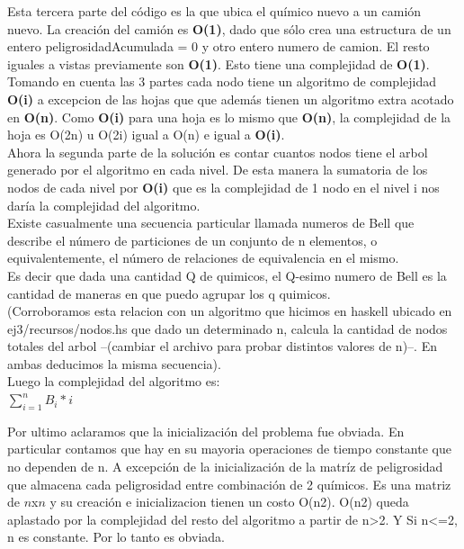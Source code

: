 \noindent 
Esta tercera parte del c\'odigo es la que ubica el qu\'imico nuevo a un cami\'on nuevo. La creaci\'on del cami\'on es \textbf{O(1)}, dado que s\'olo crea una estructura de un entero peligrosidadAcumulada = 0 y otro entero numero de camion. El resto iguales a vistas previamente son \textbf{O(1)}. Esto tiene una complejidad de \textbf{O(1)}. \\

\noindent 
Tomando en cuenta las 3 partes cada nodo tiene un algoritmo de complejidad \textbf{O(i)} a excepcion de las hojas que que adem\'as tienen un algoritmo extra acotado en \textbf{O(n)}. Como \textbf{O(i)} para una hoja es lo mismo que \textbf{O(n)}, la complejidad de la hoja es O(2n) u O(2i) igual a O(n) e igual a \textbf{O(i)}. \\

\noindent 
Ahora la segunda parte de la soluci\'on es contar cuantos nodos tiene el arbol generado por el algoritmo en cada nivel. De esta manera la sumatoria de los nodos de cada nivel por \textbf{O(i)} que es la complejidad de 1 nodo en el nivel i nos dar\'ia la complejidad del algoritmo.\\

\noindent 
Existe casualmente una secuencia particular llamada numeros de Bell que describe el número de particiones de un conjunto de n elementos, o equivalentemente, el número de relaciones de equivalencia en el mismo. \\
Es decir que dada una cantidad Q de quimicos, el Q-esimo numero de Bell es la cantidad de maneras en que puedo agrupar los q quimicos.\\
(Corroboramos esta relacion con un algoritmo que hicimos en haskell ubicado en ej3/recursos/nodos.hs que dado un determinado n, calcula la cantidad de nodos totales del arbol --(cambiar el archivo para probar distintos valores de n)--. En ambas deducimos la misma secuencia).\\

\noindent 
Luego la complejidad del algoritmo es: \\
$\sum\limits_{i{{=}}1}^n B_{i}*i$

\noindent 
Por ultimo aclaramos que la inicializaci\'on del problema fue obviada. En particular contamos que hay en su mayoria operaciones de tiempo constante que no dependen de n. A excepci\'on de la inicializaci\'on de la matr\'iz de peligrosidad que almacena cada peligrosidad entre combinaci\'on de 2 qu\'imicos. Es una matriz de $n$x$n$ y su creaci\'on e inicializacion tienen un costo O(n2). O(n2) queda aplastado por la complejidad del resto del algoritmo a partir de n>2. Y Si n<=2, n es constante. Por lo tanto es obviada.


